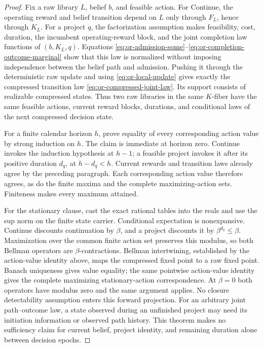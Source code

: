 \begin{proof}
Fix a raw library $L$, belief $b$, and feasible action. For Continue,
the operating reward and belief transition depend on $L$ only through
$F_L$, hence through $K_L$. For a project $q$, the factorization
assumption makes feasibility, cost, duration, the incumbent operating-reward
block, and the joint completion law functions of $(b,K_L,q)$. Equations
\eqref{eq:or-admission-some}--\eqref{eq:or-completion-outcome-marginal}
show that this law is normalized without imposing independence between the
belief path and admission. Pushing it through the deterministic raw update
and using \eqref{eq:or-local-update} gives exactly the compressed transition
law \eqref{eq:or-compressed-joint-law}. Its support consists of realizable
compressed states. Thus two raw libraries in the same $K$-fiber have the
same feasible actions, current reward blocks, durations, and conditional laws
of the next compressed decision state.

For a finite calendar horizon $h$, prove equality of every corresponding
action value by strong induction on $h$. The claim is immediate at horizon
zero. Continue invokes the induction hypothesis at $h-1$; a feasible
project invokes it after its positive duration $d_q$, at $h-d_q<h$.
Current rewards and transition laws already agree by the preceding paragraph.
Each corresponding action value therefore agrees, as do the finite maxima and
the complete maximizing-action sets. Finiteness makes every maximum attained.

For the stationary clause, cast the exact rational tables into the reals and
use the sup norm on the finite state carrier. Conditional expectation is
nonexpansive. Continue discounts continuation by $\beta$, and a project
discounts it by $\beta^{d_q}\leq\beta$. Maximization over the common finite
action set preserves this modulus, so both Bellman operators are
$\beta$-contractions. Bellman intertwining, established by the action-value
identity above, maps the compressed fixed point to a raw fixed point. Banach
uniqueness gives value equality; the same pointwise action-value identity gives
the complete maximizing stationary-action correspondence. At $\beta=0$ both
operators have modulus zero and the same argument applies. No closure
detectability assumption enters this forward projection. For an arbitrary
joint path--outcome law, a state observed during an unfinished project may
need its initiation information or observed path history. This theorem makes
no sufficiency claim for current belief, project identity, and remaining
duration alone between decision epochs.
\end{proof}
